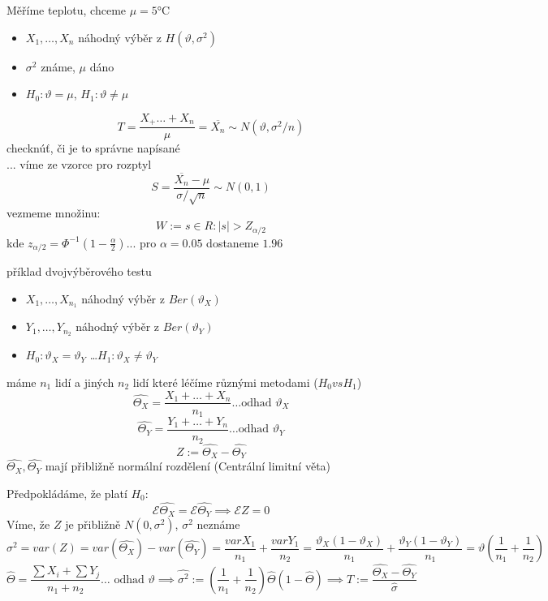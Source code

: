 \documentclass[../main.tex]{subfiles}
\begin{document}
\begin{example}
    Měříme teplotu, chceme $\mu = 5$°C
    \begin{itemize}
        \item $X_1,\dots,X_n$ náhodný výběr z $H(\vartheta,\sigma^2)$
        \item $\sigma^2$ známe, $\mu$ dáno
        \item $H_0 : \vartheta = \mu$, $H_1: \vartheta \neq \mu$
    \end{itemize}
    \[T = \frac{X_+\dots+X_n}{\mu} = \overline{X_n} \sim N(\vartheta, \sigma^2/n)\]
    checknúť, či je to správne napísané \^\\
    ... víme ze vzorce pro rozptyl
    \[S = \frac{\overline{X_n} - \mu}{\sigma/\sqrt{n}} \sim N(0,1)\]
    vezmeme množinu:
    \[W := {s\in R : |s| > Z_{\alpha/2}}\]
    kde $z_{\alpha/2} = \Phi^{-1}(1-\frac{\alpha}{2})$... pro $\alpha = 0.05$ dostaneme $1.96$
\end{example}
\begin{example}
    příklad dvojvýběrového testu
    \begin{itemize}
        \item $X_1,\dots,X_{n_1}$ náhodný výběr z $Ber(\vartheta_X)$
        \item $Y_1,\dots,Y_{n_2}$ náhodný výběr z $Ber(\vartheta_Y)$
        \item $H_0 : \vartheta_X = \vartheta_Y$ \dots $H_1 : \vartheta_X \neq \vartheta_Y$
    \end{itemize}
    máme $n_1$ lidí a jiných $n_2$ lidí které léčíme různými metodami ($H_0 vs H_1$)
    \[\widehat{\Theta_X} = \frac{X_1 +\dots + X_n}{n_1} \dots \text{odhad }\vartheta_X\]
    \[\widehat{\Theta_Y} = \frac{Y_1 +\dots + Y_n}{n_2} \dots \text{odhad }\vartheta_Y\]
    \[Z := \widehat{\Theta_X} - \widehat{\Theta_Y}\]
    $\widehat{\Theta_X}, \widehat{\Theta_Y}$ mají přibližně normální rozdělení (Centrální limitní věta)

    Předpokládáme, že platí $H_0$:
    \[\mathcal{E}\widehat{\Theta_X} = \mathcal{E}\widehat{\Theta_Y} \implies \mathcal{E}Z = 0\]
    Víme, že $Z$ je přibližně $N(0,\sigma^2)$, $\sigma^2$ neznáme
    \[\sigma^2 = var(Z) = var(\widehat{\Theta_X}) - var(\widehat{\Theta_Y}) = \frac{var X_1}{n_1} + \frac{var Y_1}{n_2} = \frac{\vartheta_X(1-\vartheta_X)}{n_1} + \frac{\vartheta_Y(1-\vartheta_Y)}{n_1} = \vartheta(\frac{1}{n_1} + \frac{1}{n_2})\]
    \[\widehat{\Theta} = \frac{\sum X_i + \sum Y_j}{n_1 + n_2} \dots \text{ odhad }\vartheta \implies \widehat{\sigma^2} := (\frac{1}{n_1} + \frac{1}{n_2}) \widehat{\Theta} (1- \widehat{\Theta}) \implies T:= \frac{\widehat{\Theta_X} - \widehat{\Theta_Y}}{\widehat{\sigma}}\]
\end{example}
\end{document}
